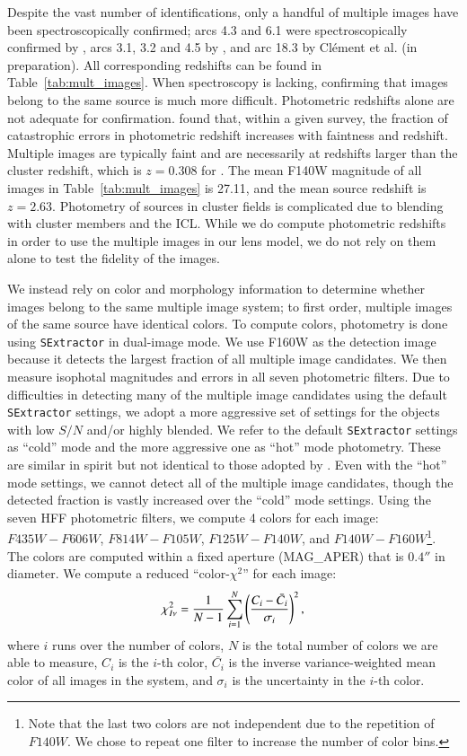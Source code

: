 Despite the vast number of identifications, only a handful of multiple images have been spectroscopically confirmed; arcs 4.3 and 
6.1 were spectroscopically confirmed by \citet{2014MNRAS.444..268R}, arcs 3.1, 3.2 and 4.5 by \citet{Joh++14}, and arc 18.3 by 
Cl\'{e}ment et al. (in preparation). All corresponding redshifts can be found in Table~\ref{tab:mult_images}.  When spectroscopy 
is lacking, confirming that images belong to the same source is much more difficult. Photometric redshifts alone are not adequate 
for confirmation.  \citet{Ilb++06} found that, within a given survey, the fraction of catastrophic errors in photometric redshift increases with faintness 
and redshift. Multiple images are typically faint and are necessarily at redshifts larger than the cluster redshift, which is 
$z=0.308$ for \cler. The mean F140W magnitude of all images in Table~\ref{tab:mult_images} is 27.11, and the mean source redshift 
is $z=2.63$. Photometry of sources in cluster fields is complicated due to blending with cluster members and the ICL.  While we do 
compute photometric redshifts in order to use the multiple images in our lens model, we do not rely on them alone to test the 
fidelity of the images.

We instead rely on color and morphology information to determine whether images belong to the same multiple image system; to first order, multiple images of the same source have identical colors. To compute colors, photometry is done using \verb+SExtractor+ in dual-image mode. We use F160W as the detection image because it detects the largest fraction of all multiple image candidates. We then measure isophotal magnitudes and errors 
in all seven photometric filters. Due to difficulties in detecting many of the multiple image candidates using the default \verb+SExtractor+ 
settings, we adopt a more aggressive set of settings for the objects with low $S/N$ and/or highly blended. We refer to the 
default \verb+SExtractor+ settings as ``cold'' mode and the more aggressive one as ``hot'' mode photometry. These are similar in spirit but not identical to those adopted by \citet{Guo+13}. Even with the ``hot'' mode settings, we cannot detect all of the multiple image candidates, though the detected fraction is vastly increased over the ``cold'' mode settings. 
Using the seven HFF photometric filters, we compute 4 colors for each image: 
$F435W-F606W$, $F814W-F105W$, $F125W-F140W$, and $F140W-F160W$\footnote{Note that the last two colors are not independent due to 
the repetition of $F140W$. We chose to repeat one filter to increase the number of color bins.}. The colors are computed 
within a fixed aperture (MAG\_APER) that is $0.4''$ in diameter. We compute a reduced ``color-$\chi^2$'' for each image:
\begin{equation}
  \chi^2_{I \nu}  = {1 \over N-1} \sum_{i=1}^{N} \left({C_i - \bar{C}_i \over \sigma_i} \right)^2,
\end{equation}
where $i$ runs over the number of colors, $N$ is the total number of colors we are able to measure, $C_i$ is the $i$-th color, 
$\bar{C_i}$ is the inverse variance-weighted mean color of all images in the system, and $\sigma_i$ is the uncertainty in the 
$i$-th color. 

